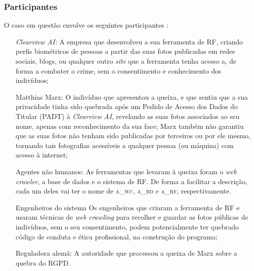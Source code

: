\documentclass[12pt]{../diazessay}
\begin{document}
\subsubsection*{Participantes}
O caso em questão envolve os seguintes participantes \parencite{first}: 
\begin{itemize}
  \item[\textit{Clearview AI:}] A empresa que desenvolveu a sua ferramenta de RF, criando perfis biométricos de pessoas a partir das suas fotos publicadas em redes sociais, blogs, ou qualquer outro \textit{site} que a ferramenta tenha acesso a, de forma a combater o crime, sem o consentimento e conhecimento dos indivíduos;
  \item[Matthias Marx:] O indivíduo que apresentou a queixa, e que sentiu que a sua privacidade tinha sido quebrada após um Pedido de Acesso dos Dados do Titular (PADT) à \textit{Clearview AI}, revelando as suas fotos associados ao seu nome, apenas com reconhecimento da sua face; Marx também não garantiu que as suas fotos não tenham sido publicadas por terceiros ou por ele mesmo, tornando tais fotografias acessíveis a qualquer pessoa (ou máquina) com acesso à internet;
  \item[Agentes não humanos:] As ferramentas que levaram à queixa foram o \textit{web crawler}, a base de dados e o sistema de RF. De forma a facilitar a descrição, cada um deles vai ter o nome de \textsc{a\_wc}, \textsc{a\_bd} e \textsc{a\_rf}, respectivamente.
  \item[Engenheiros do sistema] Os engenheiros que criaram a ferramenta de RF e usaram técnicas de \textit{web crawling} para recolher e guardar as fotos públicas de indivíduos, sem o seu consentimento, podem potencialmente ter quebrado código de conduta e ética profissional, na construção do programa;
  \item[Reguladora alemã:] A autoridade que processou a queixa de Marx sobre a quebra do RGPD.
\end{itemize}
\end{document}
